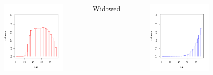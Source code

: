 \documentclass{beamer}
\begin{document}
\begin{frame}
\begin{columns}[c]
\begin{figure}
      \includegraphics[width=1\linewidth]{./Figures/age-married.png}
      \end{figure}
     \center  Widowed
      \begin{figure}
      \includegraphics[width=1\linewidth]{./Figures/age-widowed.png}
      \end{figure}
  \end{columns}
\end{frame}
\end{document}
